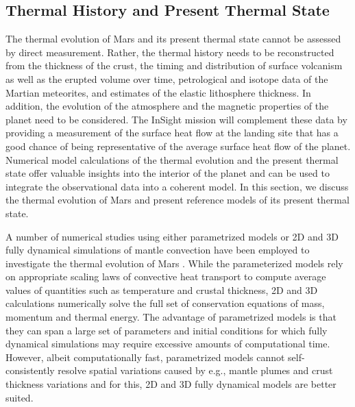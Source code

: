\subsection{Thermal History and Present Thermal State}
The thermal evolution of Mars and its present thermal state cannot be assessed by direct measurement. Rather, the thermal history needs to be reconstructed from the thickness of the crust, the timing and distribution of surface volcanism as well as the erupted volume over time, petrological and isotope data of the Martian meteorites, and estimates of the elastic lithosphere thickness. In addition, the evolution of the atmosphere and the magnetic properties of the planet need to be considered. The InSight mission will complement these data by providing a measurement of the surface heat flow at the landing site that has a good chance of being representative of the average surface heat flow \citep{Plesa2016} of the planet. Numerical model calculations of the thermal evolution and the present thermal state offer valuable insights into the interior of the planet and can be used to integrate the observational data into a coherent model. In this section, we discuss the thermal evolution of Mars and present reference models of its present thermal state.

A number of numerical studies using either parametrized models or 2D and 3D fully dynamical simulations of mantle convection have been employed to investigate the thermal evolution of Mars \citep[for a recent review see][]{BreuerMoore2015}. While the parameterized models rely on appropriate scaling laws of convective heat transport to compute average values of quantities such as temperature and crustal thickness, 2D and 3D calculations numerically solve the full set of conservation equations of mass, momentum and thermal energy. The advantage of parametrized models is that they can span a large set of parameters and initial conditions for which fully dynamical simulations may require excessive amounts of computational time. However, albeit computationally fast, parametrized models cannot self-consistently resolve spatial variations caused by e.g., mantle plumes and crust thickness variations and for this, 2D and 3D fully dynamical models are better suited.
